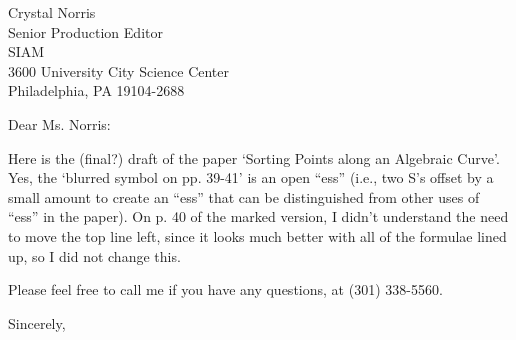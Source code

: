 \signature{John K. Johnstone}

\begin{letter}
{Crystal Norris\\
Senior Production Editor\\
SIAM\\
3600 University City Science Center\\
Philadelphia, PA  19104-2688}

\opening{Dear Ms. Norris:}

Here is the (final?) draft of the paper `Sorting Points along an Algebraic Curve'.
Yes, the `blurred symbol on pp. 39-41' is an open ``ess'' (i.e., two S's offset
by a small amount to create an ``ess'' that can be distinguished from other uses
of ``ess'' in the paper).
On p. 40 of the marked version, I didn't understand the need to move the top
line left, since it looks much better with all of the formulae lined up, 
so I did not change this.

Please feel free to call me if you have any questions, at (301) 338-5560.

\closing{Sincerely,}
\end{letter}







